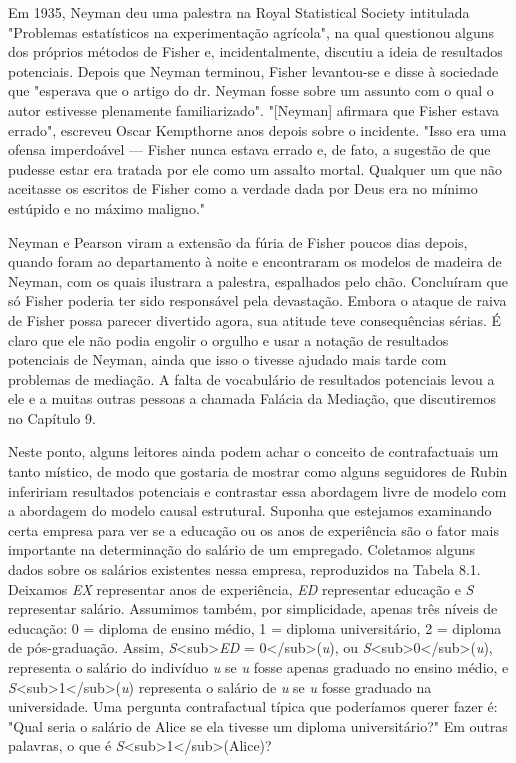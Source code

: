 \documentclass[11pt,a5paper,twoside]{book}
\begin{document}
Em 1935, Neyman deu uma palestra na Royal Statistical Society intitulada "Problemas estatísticos na experimentação agrícola", na qual questionou alguns dos próprios métodos de Fisher e, incidentalmente, discutiu a ideia de resultados potenciais. Depois que Neyman terminou, Fisher levantou-se e disse à sociedade que "esperava que o artigo do dr. Neyman fosse sobre um assunto com o qual o autor estivesse plenamente familiarizado". "[Neyman] afirmara que Fisher estava errado", escreveu Oscar Kempthorne anos depois sobre o incidente. "Isso era uma ofensa imperdoável — Fisher nunca estava errado e, de fato, a sugestão de que pudesse estar era tratada por ele como um assalto mortal. Qualquer um que não aceitasse os escritos de Fisher como a verdade dada por Deus era no mínimo estúpido e no máximo maligno."

Neyman e Pearson viram a extensão da fúria de Fisher poucos dias depois, quando foram ao departamento à noite e encontraram os modelos de madeira de Neyman, com os quais ilustrara a palestra, espalhados pelo chão. Concluíram que só Fisher poderia ter sido responsável pela devastação. Embora o ataque de raiva de Fisher possa parecer divertido agora, sua atitude teve consequências sérias. É claro que ele não podia engolir o orgulho e usar a notação de resultados potenciais de Neyman, ainda que isso o tivesse ajudado mais tarde com problemas de mediação. A falta de vocabulário de resultados potenciais levou a ele e a muitas outras pessoas a chamada Falácia da Mediação, que discutiremos no Capítulo 9.

Neste ponto, alguns leitores ainda podem achar o conceito de contrafactuais um tanto místico, de modo que gostaria de mostrar como alguns seguidores de Rubin infeririam resultados potenciais e contrastar essa abordagem livre de modelo com a abordagem do modelo causal estrutural. Suponha que estejamos examinando certa empresa para ver se a educação ou os anos de experiência são o fator mais importante na determinação do salário de um empregado. Coletamos alguns dados sobre os salários existentes nessa empresa, reproduzidos na Tabela 8.1. Deixamos \textit{EX} representar anos de experiência, \textit{ED} representar educação e \textit{S} representar salário. Assumimos também, por simplicidade, apenas três níveis de educação: 0 = diploma de ensino médio, 1 = diploma universitário, 2 = diploma de pós-graduação. Assim, \textit{S}<sub>\textit{ED} = 0</sub>(\textit{u}), ou \textit{S}<sub>0</sub>(\textit{u}), representa o salário do indivíduo \textit{u} se \textit{u} fosse apenas graduado no ensino médio, e \textit{S}<sub>1</sub>(\textit{u}) representa o salário de \textit{u} se \textit{u} fosse graduado na universidade. Uma pergunta contrafactual típica que poderíamos querer fazer é: "Qual seria o salário de Alice se ela tivesse um diploma universitário?" Em outras palavras, o que é \textit{S}<sub>1</sub>(Alice)?
\end{document}
